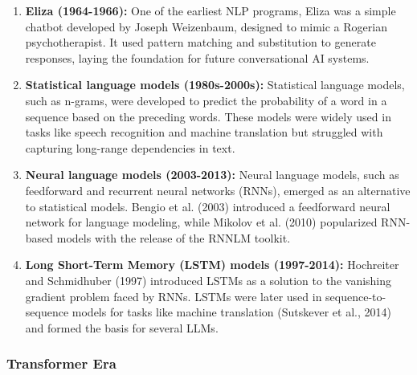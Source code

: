 \begin{enumerate}
    \item \textbf{Eliza (1964-1966):} One of the earliest NLP programs, Eliza was a simple chatbot developed by Joseph Weizenbaum, designed to mimic a Rogerian psychotherapist. It used pattern matching and substitution to generate responses, laying the foundation for future conversational AI systems.
    \item \textbf{Statistical language models (1980s-2000s):} Statistical language models, such as n-grams, were developed to predict the probability of a word in a sequence based on the preceding words. These models were widely used in tasks like speech recognition and machine translation but struggled with capturing long-range dependencies in text.
    \item \textbf{Neural language models (2003-2013):} Neural language models, such as feedforward and recurrent neural networks (RNNs), emerged as an alternative to statistical models. Bengio et al. (2003) introduced a feedforward neural network for language modeling, while Mikolov et al. (2010) popularized RNN-based models with the release of the RNNLM toolkit.
    \item \textbf{Long Short-Term Memory (LSTM) models (1997-2014):} Hochreiter and Schmidhuber (1997) introduced LSTMs as a solution to the vanishing gradient problem faced by RNNs. LSTMs were later used in sequence-to-sequence models for tasks like machine translation (Sutskever et al., 2014) and formed the basis for several LLMs.
\end{enumerate}

\subsubsection*{Transformer Era}

